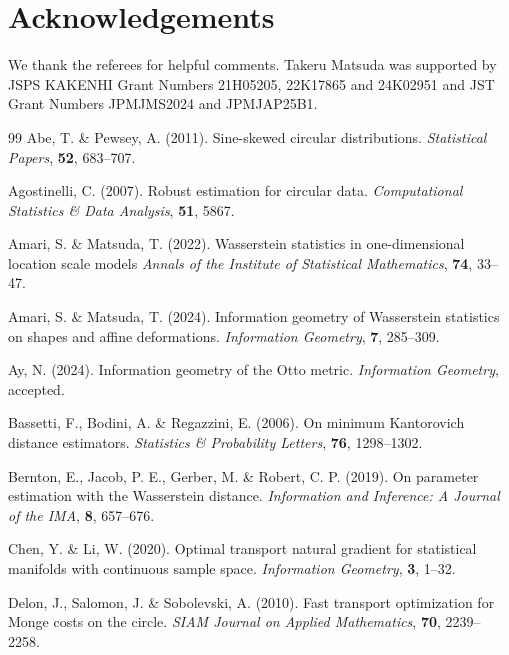 \documentclass[11pt, a4paper]{article}
\begin{document}
\section*{Acknowledgements}
We thank the referees for helpful comments.
Takeru Matsuda was supported by JSPS KAKENHI Grant Numbers 21H05205, 22K17865 and 24K02951 and JST Grant Numbers JPMJMS2024 and JPMJAP25B1.

	\begin{thebibliography}{99}
Abe, T. \& Pewsey, A. (2011).
Sine-skewed circular distributions.
\textit{Statistical Papers}, \textbf{52}, 683--707.

Agostinelli, C. (2007).
Robust estimation for circular data.
\textit{Computational Statistics \& Data Analysis}, \textbf{51}, 5867.

Amari, S. \& Matsuda, T. (2022).
Wasserstein statistics in one-dimensional location scale models
\textit{Annals of the Institute of Statistical Mathematics}, \textbf{74}, 33--47.

Amari, S. \& Matsuda, T. (2024).
Information geometry of {W}asserstein statistics on shapes and affine deformations.
\textit{Information Geometry}, \textbf{7}, 285--309.

Ay, N. (2024).
Information geometry of the {O}tto metric.
\textit{Information Geometry}, accepted.

Bassetti, F., Bodini, A. \& Regazzini, E. (2006).
On minimum Kantorovich distance estimators. 
\textit{Statistics \& Probability Letters}, \textbf{76}, 1298--1302.

Bernton, E., Jacob, P. E., Gerber, M. \& Robert, C. P. (2019).
On parameter estimation with the Wasserstein distance. 
\textit{Information and Inference: A Journal of the IMA}, \textbf{8}, 657--676.

Chen, Y. \& Li, W. (2020).
Optimal transport natural gradient for statistical manifolds with continuous sample space.
\textit{Information Geometry}, \textbf{3}, 1--32.

Delon, J., Salomon, J. \& Sobolevski, A. (2010).
Fast transport optimization for Monge costs on the circle. 
\textit{SIAM Journal on Applied Mathematics}, \textbf{70}, 2239--2258.


\end{thebibliography}
\end{document}
